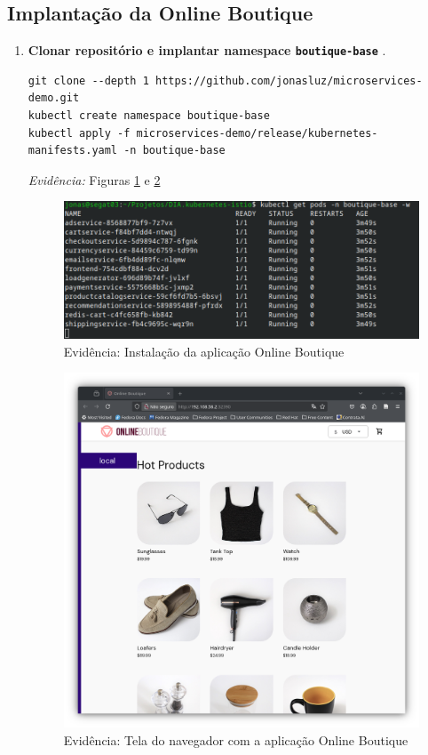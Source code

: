 \documentclass[12pt,a4paper]{report}
\begin{document}
\subsection{Implantação da Online Boutique}
\begin{enumerate}

\item\textbf{Clonar repositório e implantar namespace \texttt{boutique-base}} \cite{onlineboutique}.
\begin{lstlisting}[style=shell]
git clone --depth 1 https://github.com/jonasluz/microservices-demo.git
kubectl create namespace boutique-base
kubectl apply -f microservices-demo/release/kubernetes-manifests.yaml -n boutique-base
\end{lstlisting}
\textit{Evidência:} Figuras \ref{fig:olb-istio1} e \ref{fig:olb-istio2}\\

\begin{figure}[h]
    \centering
    \includegraphics[width=1\linewidth]{figures/evidence-olbbase2.png}
    \caption{Evidência: Instalação da aplicação Online Boutique}
    \label{fig:olb-istio1}
\end{figure}

\begin{figure}[h]
    \centering
    \includegraphics[width=1\linewidth]{figures/evidence-olbbase3.png}
    \caption{Evidência: Tela do navegador com a aplicação Online Boutique}
    \label{fig:olb-istio2}
\end{figure}


\end{enumerate}
\end{document}
